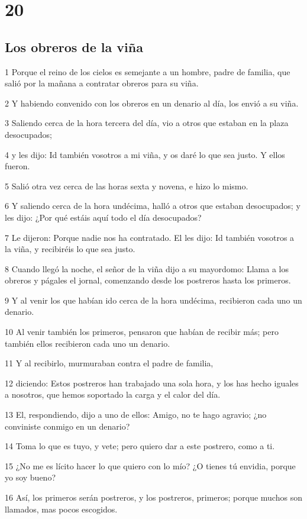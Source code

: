 \chapter{20}

\section*{Los obreros de la viña}

\par 1 Porque el reino de los cielos es semejante a un hombre, padre de familia, que salió por la mañana a contratar obreros para su viña.
\par 2 Y habiendo convenido con los obreros en un denario al día, los envió a su viña.
\par 3 Saliendo cerca de la hora tercera del día, vio a otros que estaban en la plaza desocupados;
\par 4 y les dijo: Id también vosotros a mi viña, y os daré lo que sea justo. Y ellos fueron.
\par 5 Salió otra vez cerca de las horas sexta y novena, e hizo lo mismo.
\par 6 Y saliendo cerca de la hora undécima, halló a otros que estaban desocupados; y les dijo: ¿Por qué estáis aquí todo el día desocupados?
\par 7 Le dijeron: Porque nadie nos ha contratado. El les dijo: Id también vosotros a la viña, y recibiréis lo que sea justo.
\par 8 Cuando llegó la noche, el señor de la viña dijo a su mayordomo: Llama a los obreros y págales el jornal, comenzando desde los postreros hasta los primeros.
\par 9 Y al venir los que habían ido cerca de la hora undécima, recibieron cada uno un denario.
\par 10 Al venir también los primeros, pensaron que habían de recibir más; pero también ellos recibieron cada uno un denario.
\par 11 Y al recibirlo, murmuraban contra el padre de familia,
\par 12 diciendo: Estos postreros han trabajado una sola hora, y los has hecho iguales a nosotros, que hemos soportado la carga y el calor del día.
\par 13 El, respondiendo, dijo a uno de ellos: Amigo, no te hago agravio; ¿no conviniste conmigo en un denario?
\par 14 Toma lo que es tuyo, y vete; pero quiero dar a este postrero, como a ti.
\par 15 ¿No me es lícito hacer lo que quiero con lo mío? ¿O tienes tú envidia, porque yo soy bueno?
\par 16 Así, los primeros serán postreros, y los postreros, primeros; porque muchos son llamados, mas pocos escogidos.

